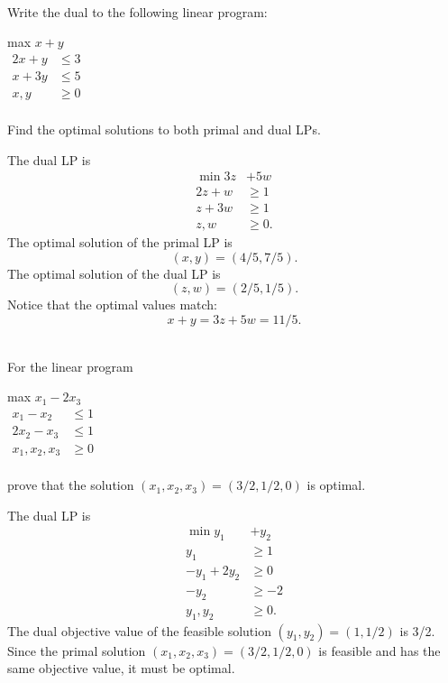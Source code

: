 \documentclass[12pt]{amsart}
\theoremstyle{plain}
\theoremstyle{definition}
\theoremstyle{remark}
\begin{document}
	\newpage
	  \\
	Write the dual to the following linear program:
	
	\begin{center}
		max $x+y$\\
		$\begin{aligned}
		2x+y &\leq 3\\
		x+3y &\leq 5\\
		x,y &\geq 0\\
		\end{aligned}$
	\end{center}

	Find the optimal solutions to both primal and dual LPs.
	
	\begin{tcolorbox}
		The dual LP is 
		\begin{equation} \nonumber
		\begin{split}
		\min 3z & + 5w\\
		2z + w & \geq 1\\
		z + 3w & \geq 1\\
		z, w & \geq 0.
		\end{split}
		\end{equation}
		The optimal solution of the primal LP is 
		\[(x,y) = ({4}/{5}, {7}/{5}).\]
		The optimal solution of the dual LP is 
		\[ (z,w) = ({2}/{5}, {1}/{5}).\]
		Notice that the optimal values match:
		\[x + y = 3z  + 5w = {11}/{5}.\]
	\end{tcolorbox}

	\newpage
	  \\
	For the linear program
	
	\begin{center}
		max $x_1-2x_3$\\
		$\begin{aligned}
		x_1-x_2 &\leq 1\\
		2x_2 - x_3 &\leq 1\\
		x_1,x_2,x_3 &\geq 0\\
		\end{aligned}$
	\end{center}

	prove that the solution $(x_1,x_2,x_3)=(3/2, 1/2, 0)$ is optimal.
	
	\begin{tcolorbox}
		The dual LP is 
		\begin{equation} \nonumber
		\begin{split}
		\min y_1 & + y_2\\
		y_1  & \geq 1\\
		-y_1 + 2 y_2 & \geq 0\\
		-y_2 & \geq -2 \\
		y_1, y_2 & \geq 0.
		\end{split}
		\end{equation}
		The dual objective value of the feasible solution $(y_1,y_2) = (1,1/2)$ is 3/2. Since the primal solution $(x_1, x_2, x_3) = (3/2, 1/2, 0)$ is feasible and has the same objective value, it must be optimal.
	\end{tcolorbox}
	
\end{document}
